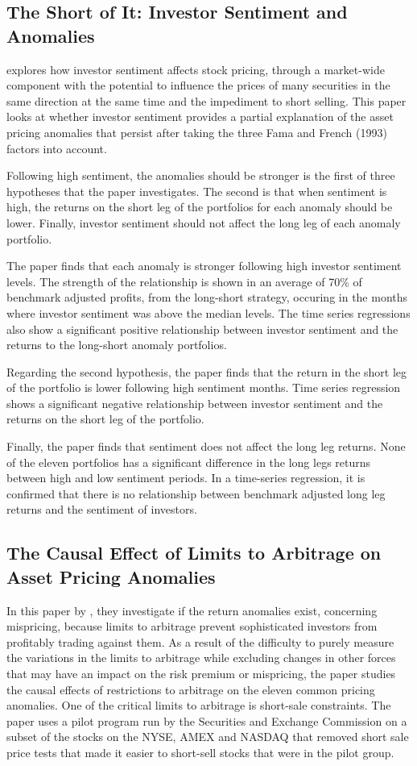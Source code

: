 \documentclass[12pt, a4paper, oneside]{article}
\begin{document}
\subsection{The Short of It: Investor Sentiment and Anomalies}
 explores how investor sentiment affects stock pricing, through a market-wide component with the potential to influence the prices of many securities in the same direction at the same time and the impediment to short selling. This paper looks at whether investor sentiment provides a partial explanation of the asset pricing anomalies that persist after taking the three Fama and French (1993) factors into account.

Following high sentiment, the anomalies should be stronger is the first of three hypotheses that the paper investigates. The second is that when sentiment is high, the returns on the short leg of the portfolios for each anomaly should be lower. Finally, investor sentiment should not affect the long leg of each anomaly portfolio. 

The paper finds that each anomaly is stronger following high investor sentiment levels. The strength of the relationship is shown in an average of 70\% of benchmark adjusted profits, from the long-short strategy, occuring in the months where investor sentiment was above the median levels. The time series regressions also show a significant positive relationship between investor sentiment and the returns to the long-short anomaly portfolios. 

Regarding the second hypothesis, the paper finds that the return in the short leg of the portfolio is lower following high sentiment months. Time series regression shows a significant negative relationship between investor sentiment and the returns on the short leg of the portfolio.

Finally, the paper finds that sentiment does not affect the long leg returns. None of the eleven portfolios has a significant difference in the long legs returns between high and low sentiment periods. In a time-series regression, it is confirmed that there is no relationship between benchmark adjusted long leg returns and the sentiment of investors.

\subsection{The Causal Effect of Limits to Arbitrage on Asset Pricing Anomalies}
In this paper by , they investigate if the return anomalies exist, concerning mispricing, because limits to arbitrage prevent sophisticated investors from profitably trading against them. As a result of the difficulty to purely measure the variations in the limits to arbitrage while excluding changes in other forces that may have an impact on the risk premium or mispricing, the paper studies the causal effects of restrictions to arbitrage on the eleven common pricing anomalies. One of the critical limits to arbitrage is short-sale constraints. The paper uses a pilot program run by the Securities and Exchange Commission on a subset of the stocks on the NYSE, AMEX and NASDAQ that removed short sale price tests that made it easier to short-sell stocks that were in the pilot group. 
\end{document}
